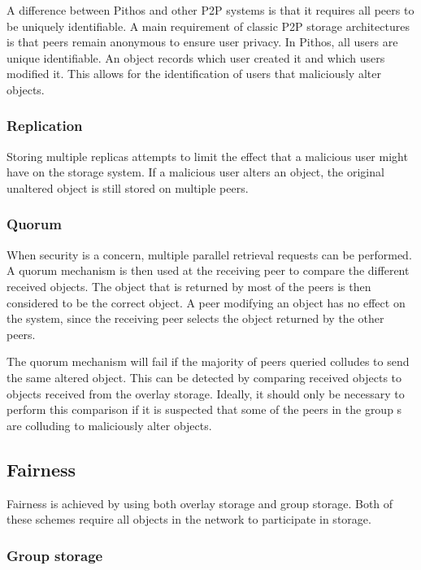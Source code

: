 A difference between Pithos and other P2P systems is that it requires all peers to be uniquely identifiable. A main requirement of classic P2P storage architectures is that peers remain anonymous to ensure user privacy. In Pithos, all users are unique identifiable. An object records which user created it and which users modified it. This allows for the identification of users that maliciously alter objects.

\subsubsection{Replication}

Storing multiple replicas attempts to limit the effect that a malicious user might have on the storage system. If a malicious user alters an object, the original unaltered object is still stored on multiple peers.

\subsubsection{Quorum}

When security is a concern, multiple parallel retrieval requests can be performed. A quorum mechanism is then used at the receiving peer to compare the different received objects. The object that is returned by most of the peers is then considered to be the correct object. A peer modifying an object has no effect on the system, since the receiving peer selects the object returned by the other peers.

The quorum mechanism will fail if the majority of peers queried colludes to send the same altered object. This can be detected by comparing received objects to objects received from the overlay storage. Ideally, it should only be necessary to perform this comparison if it is suspected that some of the peers in the group s are colluding to maliciously alter objects.

\subsection{Fairness}

Fairness is achieved by using both overlay storage and group storage. Both of these schemes require all objects in the network to participate in storage. 

\subsubsection{Group storage}

